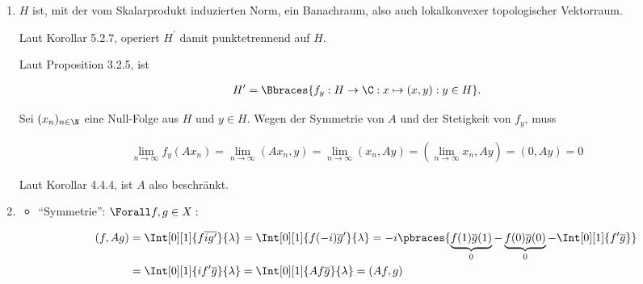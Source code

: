 \begin{solution}

\phantom{}

\begin{enumerate}

  \item
  $H$ ist, mit der vom Skalarprodukt induzierten Norm, ein Banachraum, also auch lokalkonvexer topologischer Vektorraum.


  Laut Korollar 5.2.7, operiert $H^\prime$ damit punktetrennend auf $H$.


  Laut Proposition 3.2.5, ist

  \begin{align*}
    H^\prime
    =
    \Bbraces
    {
      f_y:
      H \to \C:
      x \mapsto (x, y):
      y \in H
    }.
  \end{align*}

  Sei $(x_n)_{n \in \N}$ eine Null-Folge aus $H$ und $y \in H$.
  Wegen der Symmetrie von $A$ und der Stetigkeit von $f_y$, muss

  \begin{align*}
    \lim_{n \to \infty} f_y(A x_n)
    =
    \lim_{n \to \infty} (A x_n, y)
    =
    \lim_{n \to \infty} (x_n, A y)
    =
    (\lim_{n \to \infty} x_n, A y)
    =
    (0, A y) = 0
  \end{align*}


  Laut Korollar 4.4.4, ist $A$ also beschränkt.

  \item
  \begin{itemize}

    \item
    \enquote{Symmetrie}:
    $\Forall f, g \in X:$

    \begin{align*}
      (f, A g)
      & =
      \Int[0][1]{f \overline{i g^\prime}}{\lambda}
      =
      \Int[0][1]{f (-i) \overline{g}^\prime}{\lambda}
      =
      -i \pbraces
      {
        \underbrace{f(1) \overline{g}(1)}_0 -
        \underbrace{f(0) \overline{g}(0)}_0 -
        \Int[0][1]{f^\prime \overline{g}}
      } \\
      & =
      \Int[0][1]{i f^\prime \overline{g}}{\lambda}
      =
      \Int[0][1]{A f \overline{g}}{\lambda}
      =
      (A f, g)
    \end{align*}


\end{itemize}
\end{enumerate}
\end{solution}
